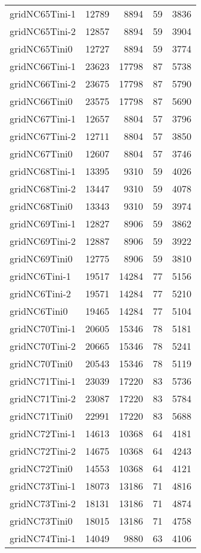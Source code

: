 \begin{longtable}{lrrrr}
gridNC65Tini-1 & 12789 & 8894 & 59 & 3836 \\
gridNC65Tini-2 & 12857 & 8894 & 59 & 3904 \\
gridNC65Tini0 & 12727 & 8894 & 59 & 3774 \\
gridNC66Tini-1 & 23623 & 17798 & 87 & 5738 \\
gridNC66Tini-2 & 23675 & 17798 & 87 & 5790 \\
gridNC66Tini0 & 23575 & 17798 & 87 & 5690 \\
gridNC67Tini-1 & 12657 & 8804 & 57 & 3796 \\
gridNC67Tini-2 & 12711 & 8804 & 57 & 3850 \\
gridNC67Tini0 & 12607 & 8804 & 57 & 3746 \\
gridNC68Tini-1 & 13395 & 9310 & 59 & 4026 \\
gridNC68Tini-2 & 13447 & 9310 & 59 & 4078 \\
gridNC68Tini0 & 13343 & 9310 & 59 & 3974 \\
gridNC69Tini-1 & 12827 & 8906 & 59 & 3862 \\
gridNC69Tini-2 & 12887 & 8906 & 59 & 3922 \\
gridNC69Tini0 & 12775 & 8906 & 59 & 3810 \\
gridNC6Tini-1 & 19517 & 14284 & 77 & 5156 \\
gridNC6Tini-2 & 19571 & 14284 & 77 & 5210 \\
gridNC6Tini0 & 19465 & 14284 & 77 & 5104 \\
gridNC70Tini-1 & 20605 & 15346 & 78 & 5181 \\
gridNC70Tini-2 & 20665 & 15346 & 78 & 5241 \\
gridNC70Tini0 & 20543 & 15346 & 78 & 5119 \\
gridNC71Tini-1 & 23039 & 17220 & 83 & 5736 \\
gridNC71Tini-2 & 23087 & 17220 & 83 & 5784 \\
gridNC71Tini0 & 22991 & 17220 & 83 & 5688 \\
gridNC72Tini-1 & 14613 & 10368 & 64 & 4181 \\
gridNC72Tini-2 & 14675 & 10368 & 64 & 4243 \\
gridNC72Tini0 & 14553 & 10368 & 64 & 4121 \\
gridNC73Tini-1 & 18073 & 13186 & 71 & 4816 \\
gridNC73Tini-2 & 18131 & 13186 & 71 & 4874 \\
gridNC73Tini0 & 18015 & 13186 & 71 & 4758 \\
gridNC74Tini-1 & 14049 & 9880 & 63 & 4106 \\

\end{longtable}
